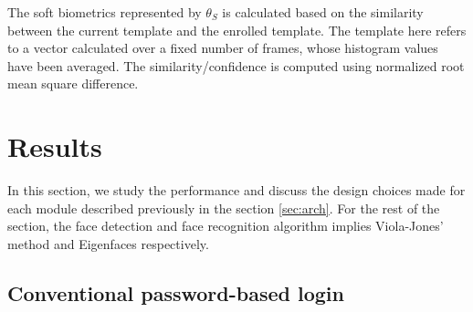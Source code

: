 \documentclass[%
        final,
        notitlepage,
        narroweqnarray,
        inline,
        ]{ieee}
\begin{document}
The soft biometrics represented by $\theta_{S}$ is calculated based on the similarity between the current template and the enrolled template.
The template here refers to a vector calculated over a fixed number of frames, whose histogram values have been averaged.
The similarity/confidence is computed using normalized root mean square difference.
 
\section{Results}
In this section, we study the performance and discuss the design choices made for each module described previously in the section \ref{sec:arch}.
For the rest of the section, the face detection and face recognition algorithm implies Viola-Jones' method and Eigenfaces respectively.

\subsection{Conventional password-based login}
\begin{figure}
	\centering
	\quad
\end{figure}
\end{document}
